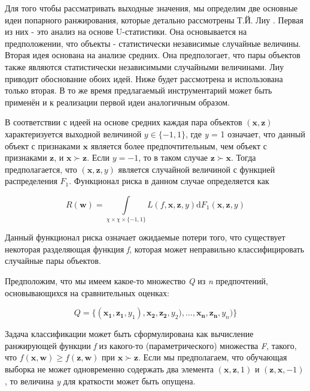 \documentclass[12pt,a4paper,oneside]{article}
\begin{document}
\par
Для того чтобы рассматривать выходные значения, мы определим две основные идеи попарного ранжирования, которые детально рассмотрены Т.Й. Лиу .
Первая из них - это анализ на основе U-статистики.
Она основывается на предположении, что объекты - статистически независимые случайные величины.
Вторая идея основана на анализе средних. 
Она предпологает, что пары объектов также являются статистически независимыми случайными величинами. 
Лиу приводит обоснование обоих идей. 
Ниже будет рассмотрена и использована только вторая. 
В то же время предлагаемый инструментарий может быть применён и к реализации первой идеи аналогичным образом. 

\par
В соответствии с идеей на основе средних  каждая пара объектов \((\mathbf{x}, \mathbf{z})\) характеризуется выходной величиной \(y \in \{-1,1\}\), где \emph{y} = 1 означает, что данный объект с признаками \(\mathbf{x}\) является более предпочтительным, чем объект с признаками \(\mathbf{z}\), и \(\mathbf{x} \succ \mathbf{z}\). Если \(y = -1\), то в таком случае \(\mathbf{z} \succ \mathbf{x}\). Тогда предполагается, что \((\mathbf{x}, \mathbf{z}, y)\) является случайной величиной с функцией распределения \(F_1\). Функционал риска в данном случае определяется как

\[
R(\mathbf{w}) = \int \limits_{\chi \times \chi \times \{-1, 1\}} L(f, \mathbf{x}, \mathbf{z}, y) \mathrm{d} F_1(\mathbf{x}, \mathbf{z}, y)
\]

\par
Данный функционал риска означает ожидаемые потери того, что существует некоторая разделяющая функция \emph{f}, которая может неправильно классифицировать случайные пары объектов. 

\par
Предположим, что мы имеем какое-то множество \emph{Q} из \emph{n} предпочтений, основывающихся на сравнительных оценках:

\[
Q = \{(\mathbf{x_1}, \mathbf{z_1}, y_1), \mathbf{x_2}, \mathbf{z_2}, y_2), \dots, \mathbf{x_n}, \mathbf{z_n}, y_n)\}
\]

\par
Задача классификации может быть сформулирована как вычисление ранжирующей функции \emph{f} из какого-то (параметрического) множества \emph{F}, такого, что \(f(\mathbf{x}, \mathbf{w}) \geq f(\mathbf{z}, \mathbf{w})\) при \(\mathbf{x} \succ \mathbf{z}\). 
Если мы предполагаем, что обучающая выборка не может одновременно содержать два элемента \((\mathbf{x}, \mathbf{z}, 1)\) и \((\mathbf{z}, \mathbf{x}, -1)\), то величина \emph{y} для краткости может быть опущена. 
\end{document}
